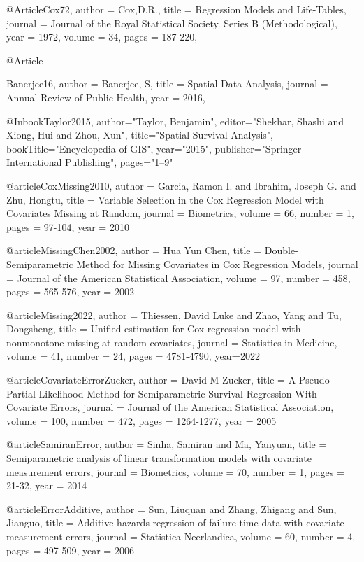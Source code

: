 @Article{Cox72,
   author =   {Cox,D.R.},
   title =    { Regression Models and Life-Tables},
   journal =      {Journal of the Royal Statistical Society. Series B (Methodological)},
   year =     {1972},
   volume =   {34},
   pages =    {187-220},
 }



@Article{Banerjee16,
   author =   {Banerjee, S},
   title =    {Spatial Data Analysis},
   journal =      {Annual Review of Public Health},
   year =     {2016},
   
 }

@Inbook{Taylor2015,
author="Taylor, Benjamin",
editor="Shekhar, Shashi
and Xiong, Hui
and Zhou, Xun",
title="Spatial Survival Analysis",
bookTitle="Encyclopedia of GIS",
year="2015",
publisher="Springer International Publishing",
pages="1--9"
}

@article{CoxMissing2010,
author = {Garcia, Ramon I. and Ibrahim, Joseph G. and Zhu, Hongtu},
title = {Variable Selection in the Cox Regression Model with Covariates Missing at Random},
journal = {Biometrics},
volume = {66},
number = {1},
pages = {97-104},
year = {2010}
}

@article{MissingChen2002,
author = {Hua Yun Chen},
title = {Double-Semiparametric Method for Missing Covariates in Cox Regression Models},
journal = {Journal of the American Statistical Association},
volume = {97},
number = {458},
pages = {565-576},
year  = {2002}}

@article{Missing2022,
author = {Thiessen, David Luke and Zhao, Yang and Tu, Dongsheng},
title = {Unified estimation for Cox regression model with nonmonotone missing at random covariates},
journal = {Statistics in Medicine},
volume = {41},
number = {24},
pages = {4781-4790},
year={2022}}

@article{CovariateErrorZucker,
author = {David M Zucker},
title = {A Pseudo–Partial Likelihood Method for Semiparametric Survival Regression With Covariate Errors},
journal = {Journal of the American Statistical Association},
volume = {100},
number = {472},
pages = {1264-1277},
year  = {2005}}

@article{SamiranError,
author = {Sinha, Samiran and Ma, Yanyuan},
title = {Semiparametric analysis of linear transformation models with covariate measurement errors},
journal = {Biometrics},
volume = {70},
number = {1},
pages = {21-32},
year = {2014}
}

@article{ErrorAdditive,
author = {Sun, Liuquan and Zhang, Zhigang and Sun, Jianguo},
title = {Additive hazards regression of failure time data with covariate measurement errors},
journal = {Statistica Neerlandica},
volume = {60},
number = {4},
pages = {497-509},
year = {2006}
}





